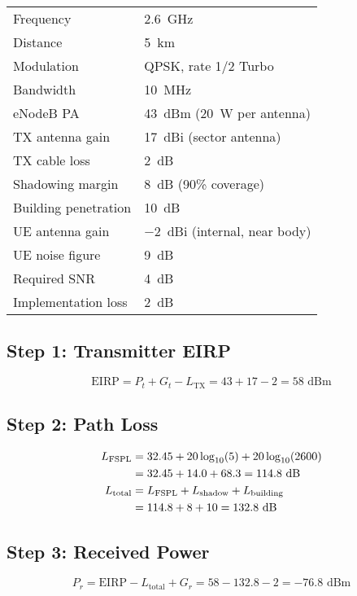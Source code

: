 \begin{tabular}{@{}ll@{}}
Frequency & 2.6~GHz \\
Distance & 5~km \\
Modulation & QPSK, rate 1/2 Turbo \\
Bandwidth & 10~MHz \\
eNodeB PA & 43~dBm (20~W per antenna) \\
TX antenna gain & 17~dBi (sector antenna) \\
TX cable loss & 2~dB \\
Shadowing margin & 8~dB (90\% coverage) \\
Building penetration & 10~dB \\
UE antenna gain & $-2$~dBi (internal, near body) \\
UE noise figure & 9~dB \\
Required SNR & 4~dB \\
Implementation loss & 2~dB \\
\end{tabular}

\subsection*{Step 1: Transmitter EIRP}

\begin{equation}
\text{EIRP} = P_t + G_t - L_{\text{TX}} = 43 + 17 - 2 = 58\text{~dBm}
\label{eq:ex3-eirp}
\end{equation}

\subsection*{Step 2: Path Loss}

\begin{align}
L_{\text{FSPL}} &= 32.45 + 20\log_{10}(5) + 20\log_{10}(2600) \notag \\
&= 32.45 + 14.0 + 68.3 = 114.8\text{~dB} \notag \\
L_{\text{total}} &= L_{\text{FSPL}} + L_{\text{shadow}} + L_{\text{building}} \notag \\
&= 114.8 + 8 + 10 = 132.8\text{~dB}
\label{eq:ex3-path-loss}
\end{align}

\subsection*{Step 3: Received Power}

\begin{equation}
P_r = \text{EIRP} - L_{\text{total}} + G_r = 58 - 132.8 - 2 = -76.8\text{~dBm}
\label{eq:ex3-rx-power}
\end{equation}

